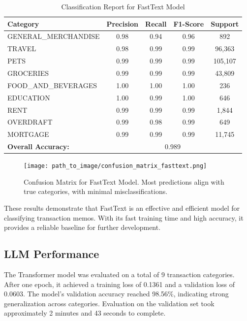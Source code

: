 \documentclass[12pt,letterpaper]{article}
\begin{document}
\begin{table}[H]
    \centering
    \begin{tabular}{lcccc}
        \hline
        \textbf{Category} & \textbf{Precision} & \textbf{Recall} & \textbf{F1-Score} & \textbf{Support} \\
        \hline
        GENERAL\_MERCHANDISE & 0.98 & 0.94 & 0.96 & 892 \\
        TRAVEL               & 0.98 & 0.99 & 0.99 & 96,363 \\
        PETS                 & 0.99 & 0.99 & 0.99 & 105,107 \\
        GROCERIES            & 0.99 & 0.99 & 0.99 & 43,809 \\
        FOOD\_AND\_BEVERAGES & 1.00 & 1.00 & 1.00 & 236 \\
        EDUCATION            & 1.00 & 0.99 & 1.00 & 646 \\
        RENT                 & 0.99 & 0.99 & 0.99 & 1,844 \\
        OVERDRAFT            & 0.99 & 0.98 & 0.99 & 649 \\
        MORTGAGE             & 0.99 & 0.99 & 0.99 & 11,745 \\
        \hline
        \textbf{Overall Accuracy:} & \multicolumn{4}{c}{0.989} \\
        \hline
    \end{tabular}
    \caption{Classification Report for FastText Model}
    \label{tab:fasttext_classification_report}
\end{table}

\begin{figure}[H]
    \centering
    \texttt{[image: path\_to\_image/confusion\_matrix\_fasttext.png]}
    \caption{Confusion Matrix for FastText Model. Most predictions align with true categories, with minimal misclassifications.}
    \label{fig:confusion_matrix_fasttext}
\end{figure}

These results demonstrate that FastText is an effective and efficient model for classifying transaction memos. With its fast training time and high accuracy, it provides a reliable baseline for further development.

\subsection{LLM Performance}
The Transformer model was evaluated on a total of 9 transaction categories. After one epoch, it achieved a training loss of 0.1361 and a validation loss of 0.0603. The model’s validation accuracy reached 98.56\%, indicating strong generalization across categories. Evaluation on the validation set took approximately 2 minutes and 43 seconds to complete.
\end{document}
